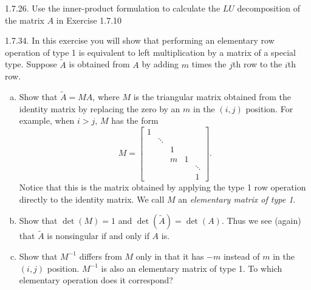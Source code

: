 \documentclass{report}
\begin{document}
    \bigbreak \noindent 
    \begin{mdframed}
        1.7.26. Use the inner-product formulation to calculate the $LU$ decomposition of the matrix $A$ in Exercise 1.7.10 
    \end{mdframed}

    \bigbreak \noindent 
    \begin{mdframed}
        1.7.34.  In this exercise you will show that performing an elementary row operation of type 1 is equivalent to left multiplication by a matrix of a special type. Suppose $\tilde{A}$ is obtained from $A$ by adding $m$ times the $j$th row to the $i$th row.

        \begin{enumerate}[(a)]
            \item Show that $\tilde{A} = M A$, where $M$ is the triangular matrix obtained 
                from the identity matrix by replacing the zero by an $m$ in the $(i,j)$ position. 
                For example, when $i > j$, $M$ has the form
                \[
                    M = \begin{bmatrix}
                        1 &        &        &        &   \\
                          & \ddots &        &        &   \\
                          &        & 1      &        &   \\
                          &        & m      & 1      &   \\
                          &        &        &        & \ddots \\
                          &        &        &        &        1
                    \end{bmatrix}.
                \]
                Notice that this is the matrix obtained by applying the type 1 row operation 
                directly to the identity matrix. We call $M$ an \textit{elementary matrix of type 1}.

            \item Show that $\det(M) = 1$ and $\det(\tilde{A}) = \det(A)$. 
                Thus we see (again) that $\tilde{A}$ is nonsingular if and only if $A$ is.

            \item Show that $M^{-1}$ differs from $M$ only in that it has $-m$ instead of $m$ 
                in the $(i,j)$ position. $M^{-1}$ is also an elementary matrix of type 1. 
                To which elementary operation does it correspond?
        \end{enumerate}
    \end{mdframed}
\end{document}
